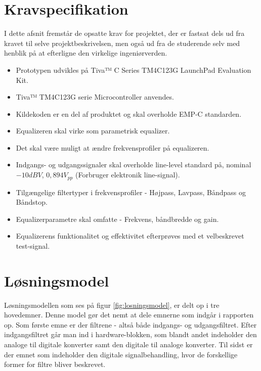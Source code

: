\section{Kravspecifikation} \label{afs:kravspecifikation}
I dette afsnit fremstår de opsatte krav for projektet, der er fastsat dels ud fra kravet til selve projektbeskrivelsen, men også ud fra de studerende selv med henblik på at efterligne den virkelige ingeniørverden.

\begin{itemize}[noitemsep,nolistsep]
	\item Prototypen udvikles på Tiva™ C Series TM4C123G LaunchPad Evaluation Kit.
	\item Tiva™ TM4C123G serie Microcontroller anvendes.
	\item Kildekoden er en del af produktet og skal overholde EMP-C standarden.
	\item Equalizeren skal virke som parametrisk equalizer.
	\item Det skal være muligt at ændre frekvensprofiler på equalizeren.
	\item Indgangs- og udgangssignaler skal overholde line-level standard på, nominal $-10 dBV$, $0,894 V_{pp}$ (Forbruger elektronik line-signal).
	\item Tilgængelige filtertyper i frekvensprofiler - Højpass, Lavpass, Båndpass og Båndstop.
	\item Equalizerparametre skal omfatte - Frekvens, båndbredde og gain.
	\item Equalizerens funktionalitet og effektivitet efterprøves med et velbeskrevet test-signal.
\end{itemize}

\section{Løsningsmodel}
Løsningsmodellen som ses på figur \ref{fig:losningsmodel}, er delt op i tre hovedemner. Denne model gør det nemt at dele emnerne som indgår i rapporten op. Som første emne er der filtrene - altså både indgangs- og udgangsfiltret. Efter indgangsfiltret går man ind i hardware-blokken, som blandt andet indeholder den analoge til digitale konverter samt den digitale til analoge konverter. Til sidst er der emnet som indeholder den digitale signalbehandling, hvor de forskellige former for filtre bliver beskrevet.  

